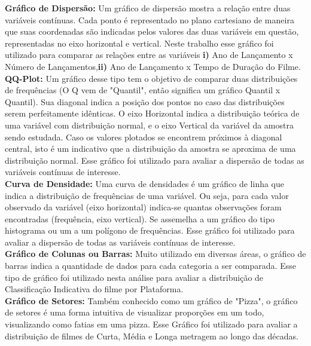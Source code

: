 \documentclass[a4paper, 12pt]{article} %
\begin{document}
\textbf{Gráfico de Dispersão:} Um gráfico de dispersão mostra a relação entre duas variáveis contínuas. Cada ponto é representado no plano cartesiano de maneira que suas coordenadas são indicadas pelos valores das duas variáveis em questão, representadas no eixo horizontal e vertical. Neste trabalho esse gráfico foi utilizado para comparar as relações entre as variáveis \textbf{i)} Ano de Lançamento x Número de Lançamentos,\textbf{ii)} Ano de Lançamento x Tempo de Duração do Filme. \\

\textbf{QQ-Plot:} Um gráfico desse tipo tem o objetivo de comparar duas distribuições de frequências (O Q vem de "Quantil", então significa um gráfico Quantil x Quantil). Sua diagonal indica a posição dos pontos no caso das distribuições serem perfeitamente idênticas. O eixo Horizontal indica a distribuição teórica de uma variável com distribuição normal, e o eixo Vertical da variável da amostra sendo estudada. Caso os valores plotados se encontrem próximos à diagonal central, isto é um indicativo que a distribuição da amostra se aproxima de uma distribuição normal. Esse gráfico foi utilizado para avaliar a dispersão de todas as variáveis contínuas de interesse. \\

\textbf{Curva de Densidade:} Uma curva de densidades é um gráfico de linha que indica a distribuição de frequências de uma variável. Ou seja, para cada valor observado da variável (eixo horizontal) indica-se quantas observações foram encontradas (frequência, eixo vertical). Se assemelha a um gráfico do tipo histograma ou um a um polígono de frequências. Esse gráfico foi utilizado para avaliar a dispersão de todas as variáveis contínuas de interesse. \\

\textbf{Gráfico de Colunas ou Barras:} Muito utilizado em diversas áreas, o gráfico de barras indica a quantidade de dados para cada categoria a ser comparada. Esse tipo de gráfico foi utilizado nesta análise para avaliar a distribuição de Classificação Indicativa do filme por Plataforma. \\ 

\textbf{Gráfico de Setores:} Também conhecido como um gráfico de "Pizza", o gráfico de setores é uma forma intuitiva de visualizar proporções em um todo, visualizando como fatias em uma pizza. Esse Gráfico foi utilizado para avaliar a distribuição de filmes de Curta, Média e Longa metragem ao longo das décadas. \\
\end{document}
